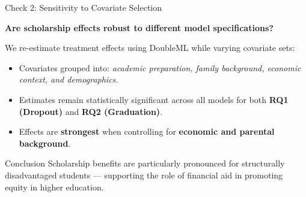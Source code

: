 \documentclass[aspectratio=169]{beamer}
\begin{document}
\begin{frame}{Check 2: Sensitivity to Covariate Selection}

\textbf{Are scholarship effects robust to different model specifications?} 

We re-estimate treatment effects using DoubleML while varying covariate sets:
\begin{itemize}[label=--, itemsep=1pt]
    \item Covariates grouped into: \textit{academic preparation, family background, economic context, and demographics.}
    \item Estimates remain statistically significant across all models for both \textbf{RQ1 (Dropout)} and \textbf{RQ2 (Graduation)}.
    \item Effects are \textbf{strongest} when controlling for \textbf{economic and parental background}.
\end{itemize}
\vspace{5pt}
\begin{block}{Conclusion}
Scholarship benefits are particularly pronounced for structurally disadvantaged students — supporting the role of financial aid in promoting equity in higher education.
\end{block}

\end{frame}
\end{document}
